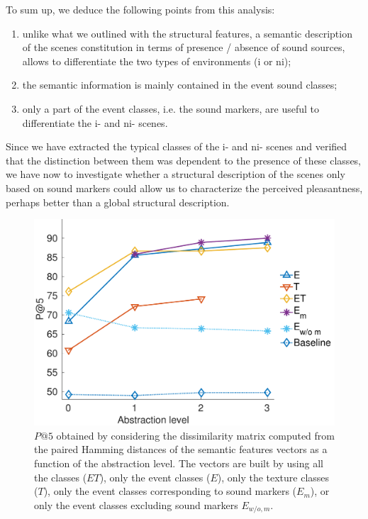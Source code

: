 \documentclass[twoside,twocolumn]{article}
\begin{document}
To sum up, we deduce the following points from this analysis:

\begin{enumerate}
\item unlike what we outlined with the structural features, a semantic description of the scenes constitution in terms of presence / absence of sound sources, allows to differentiate the two types of environments (i or ni);
\item the semantic information is mainly contained in the event sound classes;
\item only a part of the event classes, i.e. the sound markers, are useful to differentiate the i- and ni- scenes.
\end{enumerate}

Since we have extracted the typical classes of the i- and ni- scenes and verified that the distinction between them was dependent to the presence of these classes, we have now to investigate whether a structural description of the scenes only based on sound markers could allow us to characterize the perceived pleasantness, perhaps better than a global structural description.

\begin{figure}[t]
        \myfloatalign
        \includegraphics[width=\linewidth]{gfx/ch_5/pa5_1_en}
       \caption{$P@5$ obtained by considering the dissimilarity matrix computed from the paired Hamming distances of the semantic features vectors as a function of the abstraction level. The vectors are built by using all the classes ($ET$), only the event classes ($E$), only the texture classes ($T$), only the event classes corresponding to sound markers ($E_m$), or only the event classes excluding sound markers $E_{w/o,m}$.}\label{fig:pa5}
\end{figure}
\end{document}

